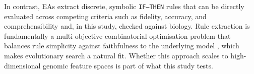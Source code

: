 In contrast, EAs extract discrete, symbolic \texttt{IF--THEN} rules that can be directly evaluated across competing criteria such as fidelity, accuracy, and comprehensibility \citep{yedjour2024} and, in this study, checked against biology. Rule extraction is fundamentally a multi-objective combinatorial optimisation problem that balances rule simplicity against faithfulness to the underlying model \citep{yedjour2024}, which makes evolutionary search a natural fit. Whether this approach scales to high-dimensional genomic feature spaces is part of what this study tests.